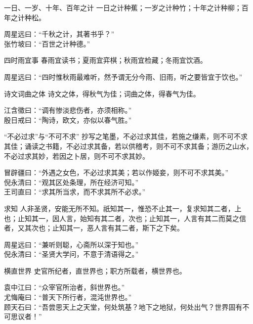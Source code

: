 \begin{yulu}{一日、一岁、十年、百年之计}
一日之计种蕉；一岁之计种竹；十年之计种柳；百年之计种松。
\begin{comments}
周星远曰：“千秋之计，其著书乎？” \\
张竹坡曰：“百世之计种德。”
\end{comments}
\end{yulu}

\begin{yulu}{四时雨宜事}
春雨宜读书；夏雨宜弈棋；秋雨宜检藏；冬雨宜饮酒。
\begin{comments}
周星远曰：“四时惟秋雨最难听，然予谓无分今雨、旧雨，听之要皆宜于饮也。”
\end{comments}
\end{yulu}

\begin{yulu}{诗文词曲之体}
诗文之体，得秋气为佳；词曲之体，得春气为佳。
\begin{comments}
江含徵曰：“调有惨淡悲伤者，亦须相称。” \\
殷日戒曰：“陶诗，欧文，亦似以春气胜。”
\end{comments}
\end{yulu}

\begin{yulu}{“不必过求”与“不可不求”}
抄写之笔墨，不必过求其佳，若施之缣素，则不可不求其佳；诵读之书籍，不必过求其备，若以供稽考，则不可不求其备；游历之山水，不必过求其妙，若因之卜居，则不可不求其妙。
\begin{comments}
冒辟疆曰：“外遇之女色，不必过求其美；若以作姬妾，则不可不求其美。” \\
倪永清曰：“观其区处条理，所在经济可知。” \\
王司直曰：“求其所当求，而不求其所不必求。”
\end{comments}
\end{yulu}

\begin{yulu}{求知}
人非圣贤，安能无所不知。祇知其一，惟恐不止其一，复求知其二者，上也；止知其一，因人言，始知有其二者，次也；止知其一，人言有其二而莫之信者，又其次也；止知其一，恶人言有其二者，斯下之下矣。
\begin{comments}
周星远曰：“兼听则聪，心斋所以深于知也。” \\
倪永清曰：“圣贤大学问，不意于清语得之。”
\end{comments}
\end{yulu}

\begin{yulu}{横直世界}
史官所纪者，直世界也；职方所载者，横世界也。
\begin{comments}
袁中江曰：“众宰官所治者，斜世界也。” \\
尤悔庵曰：“普天下所行者，混沌世界也。” \\
顾天石曰：“吾尝思天上之天堂，何处筑基？地下之地狱，何处出气？世界固有不可思议者！”
\end{comments}
\end{yulu}

